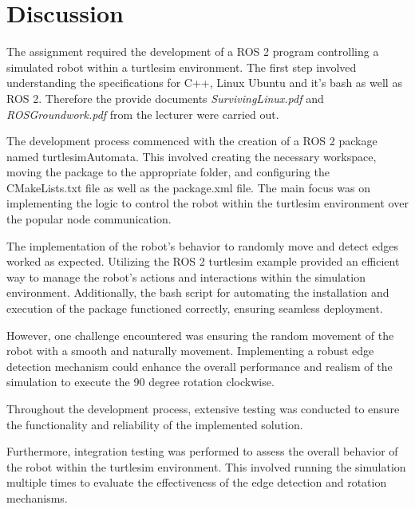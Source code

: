 \section{Discussion} \label{sec:discussion}
The assignment required the development of a ROS 2 program controlling a simulated robot within a turtlesim environment. The first step involved understanding the specifications for C++, Linux Ubuntu and it's bash as well as ROS 2. Therefore the provide documents \textit{SurvivingLinux.pdf} and \textit{ROSGroundwork.pdf} from the lecturer were carried out.

The development process commenced with the creation of a ROS 2 package named turtlesimAutomata. This involved creating the necessary workspace, moving the package to the appropriate folder, and configuring the CMakeLists.txt file as well as the package.xml file. The main focus was on implementing the logic to control the robot within the turtlesim environment over the popular node communication.

The implementation of the robot's behavior to randomly move and detect edges worked as expected. Utilizing the ROS 2 turtlesim example provided an efficient way to manage the robot's actions and interactions within the simulation environment. Additionally, the bash script for automating the installation and execution of the package functioned correctly, ensuring seamless deployment.

However, one challenge encountered was ensuring the random movement of the robot with a smooth and naturally movement. Implementing a robust edge detection mechanism could enhance the overall performance and realism of the simulation to execute the 90 degree rotation clockwise.

Throughout the development process, extensive testing was conducted to ensure the functionality and reliability of the implemented solution.

Furthermore, integration testing was performed to assess the overall behavior of the robot within the turtlesim environment. This involved running the simulation multiple times to evaluate the effectiveness of the edge detection and rotation mechanisms.